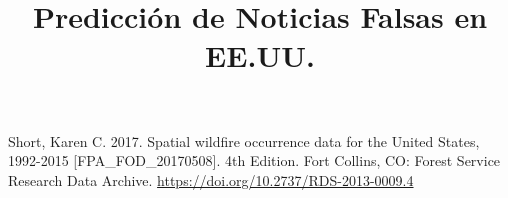 \documentclass[conference]{IEEEtran}
\begin{document}
\title{Predicción de Noticias Falsas en EE.UU.}

\author{
\and
{}
\and
{}
}

\maketitle

\begin{abstract}
\lipsum[1]
\end{abstract}




% 

% 

% 

% 

% 

\begin{thebibliography}{00}
 Short, Karen C. 2017. Spatial wildfire occurrence data for the United States, 1992-2015 [FPA\_FOD\_20170508]. 4th Edition. Fort Collins, CO: Forest Service Research Data Archive. \url{https://doi.org/10.2737/RDS-2013-0009.4}

\end{thebibliography}
\newpage

% 
\end{document}
